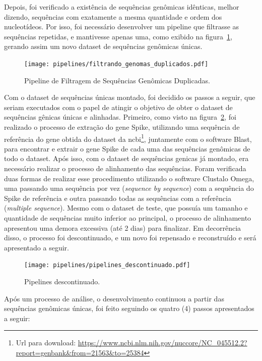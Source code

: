 Depois, foi verificado a existência de sequências genômicas idênticas, melhor dizendo, sequências com exatamente a mesma quantidade e ordem dos nucleotídeos. Por isso, foi necessário desenvolver um pipeline que filtrasse as sequências repetidas, e mantivesse apenas uma, como exibido na figura~\ref{fig:pipelineGenomicasDuplicadas}, gerando assim um novo dataset de sequências genômicas únicas.

\begin{figure}[htb]
  \centering
  \caption{Pipeline de Filtragem de Sequências Genômicas Duplicadas.}
  \texttt{[image: pipelines/filtrando\_genomas\_duplicados.pdf]}
  ~\label{fig:pipelineGenomicasDuplicadas}
\end{figure}

Com o dataset de sequências únicas montado, foi decidido os passos a seguir, que seriam executados com o papel de atingir o objetivo de obter o dataset de sequências gênicas únicas e alinhadas. Primeiro, como visto na figura~\ref{fig:pipelinesDescontinuados}, foi realizado o processo de extração do gene Spike, utilizando uma sequência de referência do gene obtida do dataset da \gls{ncbi}\footnote{Url para download: \url{https://www.ncbi.nlm.nih.gov/nuccore/NC_045512.2?report=genbank&from=21563&to=25384}}, juntamente com o software Blast, para encontrar e extrair o gene Spike de cada uma das sequências genômicas de todo o dataset. Após isso, com o dataset de sequências genicas já montado, era necessário realizar o processo de alinhamento das sequências. Foram verificada duas formas de realizar esse procedimento utilizando o software Clustalo Omega, uma passando uma sequência por vez (\textit{sequence by sequence}) com a sequência do Spike de referência e outra passando todas as sequências com a referência (\textit{multiple sequence}). Mesmo com o dataset de teste, que possuía um tamanho e quantidade de sequências muito inferior ao principal, o processo de alinhamento apresentou uma demora excessiva (até 2 dias) para finalizar. Em decorrência disso, o processo foi descontinuado, e um novo foi repensado e reconstruído e será apresentado a seguir.

\begin{figure}[htb]
  \centering
  \caption{Pipelines descontinuado.}
  \texttt{[image: pipelines/pipelines\_descontinuado.pdf]}
  ~\label{fig:pipelinesDescontinuados}
\end{figure}

Após um processo de análise, o desenvolvimento continuou a partir das sequências genômicas únicas, foi feito seguindo os quatro (4) passos apresentados a seguir:

